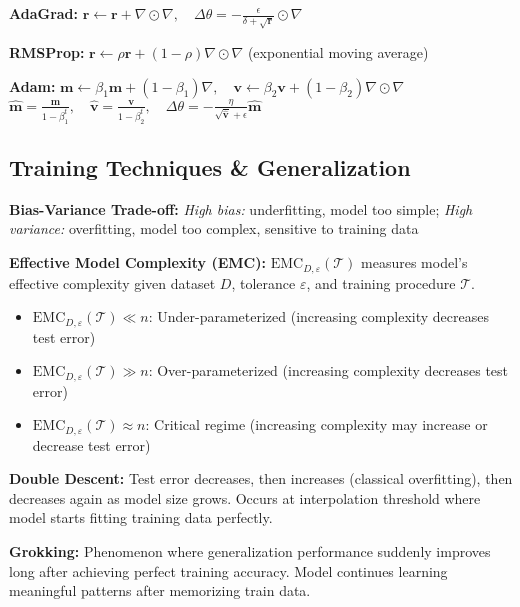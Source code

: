 \textbf{AdaGrad:} $\mathbf{r} \leftarrow \mathbf{r} + \nabla \odot \nabla, \quad \Delta\theta = -\frac{\epsilon}{\delta + \sqrt{\mathbf{r}}} \odot \nabla$

\textbf{RMSProp:} $\mathbf{r} \leftarrow \rho \mathbf{r} + (1-\rho) \nabla \odot \nabla$ (exponential moving average)

\textbf{Adam:} 
$\mathbf{m} \leftarrow \beta_1 \mathbf{m} + (1-\beta_1) \nabla, \quad \mathbf{v} \leftarrow \beta_2 \mathbf{v} + (1-\beta_2) \nabla \odot \nabla$\\
$\hat{\mathbf{m}} = \frac{\mathbf{m}}{1-\beta_1^t}, \quad \hat{\mathbf{v}} = \frac{\mathbf{v}}{1-\beta_2^t}, \quad \Delta\theta = -\frac{\eta}{\sqrt{\hat{\mathbf{v}}} + \epsilon}\hat{\mathbf{m}}$

\subsection{Training Techniques \& Generalization}

\textbf{Bias-Variance Trade-off:} \textit{High bias:} underfitting, model too simple; \textit{High variance:} overfitting, model too complex, sensitive to training data

\textbf{Effective Model Complexity (EMC):} $\text{EMC}_{D,\varepsilon}(\mathcal{T})$ measures model's effective complexity given dataset $D$, tolerance $\varepsilon$, and training procedure $\mathcal{T}$.

\begin{itemize}
    \item $\text{EMC}_{D,\varepsilon}(\mathcal{T}) \ll n$: Under-parameterized (increasing complexity decreases test error)
    \item $\text{EMC}_{D,\varepsilon}(\mathcal{T}) \gg n$: Over-parameterized (increasing complexity decreases test error)
    \item $\text{EMC}_{D,\varepsilon}(\mathcal{T}) \approx n$: Critical regime (increasing complexity may increase or decrease test error)
\end{itemize}

\textbf{Double Descent:} Test error decreases, then increases (classical overfitting), then decreases again as model size grows. Occurs at interpolation threshold where model starts fitting training data perfectly.

\textbf{Grokking:} Phenomenon where generalization performance suddenly improves long after achieving perfect training accuracy. Model continues learning meaningful patterns after memorizing train data.



